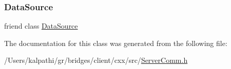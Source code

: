 \subsubsection{\texorpdfstring{Data\+Source}{DataSource}}
{\footnotesize\ttfamily friend class \mbox{\hyperlink{classbridges_1_1_data_source}{Data\+Source}}\hspace{0.3cm}{\ttfamily [friend]}}



The documentation for this class was generated from the following file\+:\begin{DoxyCompactItemize}
\item 
/\+Users/kalpathi/gr/bridges/client/cxx/src/\mbox{\hyperlink{_server_comm_8h}{Server\+Comm.\+h}}\end{DoxyCompactItemize}
